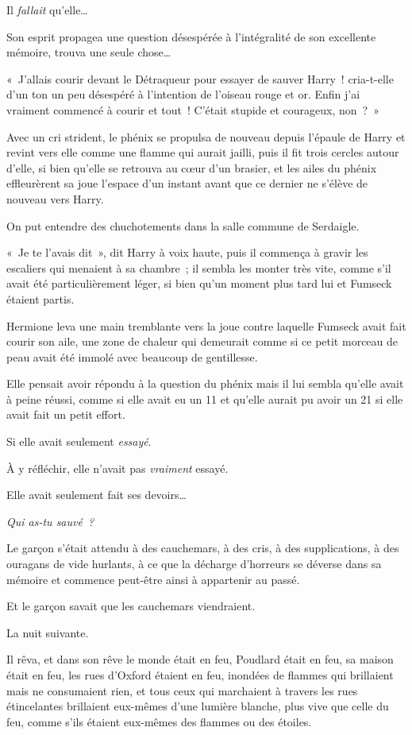 Il \emph{fallait} qu'elle…

Son esprit propagea une question désespérée à l'intégralité de son excellente mémoire, trouva une seule chose…

«~J'allais courir devant le Détraqueur pour essayer de sauver Harry~! cria-t-elle d'un ton un peu désespéré à l'intention de l'oiseau rouge et or. Enfin j'ai vraiment commencé à courir et tout~! C'était stupide et courageux, non~?~»

Avec un cri strident, le phénix se propulsa de nouveau depuis l'épaule de Harry et revint vers elle comme une flamme qui aurait jailli, puis il fit trois cercles autour d'elle, si bien qu'elle se retrouva au cœur d'un brasier, et les ailes du phénix effleurèrent sa joue l'espace d'un instant avant que ce dernier ne s'élève de nouveau vers Harry.

On put entendre des chuchotements dans la salle commune de Serdaigle.

«~Je te l'avais dit~», dit Harry à voix haute, puis il commença à gravir les escaliers qui menaient à sa chambre~; il sembla les monter très vite, comme s'il avait été particulièrement léger, si bien qu'un moment plus tard lui et Fumseck étaient partis.

Hermione leva une main tremblante vers la joue contre laquelle Fumseck avait fait courir son aile, une zone de chaleur qui demeurait comme si ce petit morceau de peau avait été immolé avec beaucoup de gentillesse.

Elle pensait avoir répondu à la question du phénix mais il lui sembla qu'elle avait à peine réussi, comme si elle avait eu un 11 et qu'elle aurait pu avoir un 21 si elle avait fait un petit effort.

Si elle avait seulement \emph{essayé}.

À y réfléchir, elle n'avait pas \emph{vraiment} essayé.

Elle avait seulement fait ses devoirs…

\emph{Qui as-tu sauvé~?}


Le garçon s'était attendu à des cauchemars, à des cris, à des supplications, à des ouragans de vide hurlants, à ce que la décharge d'horreurs se déverse dans sa mémoire et commence peut-être ainsi à appartenir au passé.

Et le garçon savait que les cauchemars viendraient.

La nuit suivante.

Il rêva, et dans son rêve le monde était en feu, Poudlard était en feu, sa maison était en feu, les rues d'Oxford étaient en feu, inondées de flammes qui brillaient mais ne consumaient rien, et tous ceux qui marchaient à travers les rues étincelantes brillaient eux-mêmes d'une lumière blanche, plus vive que celle du feu, comme s'ils étaient eux-mêmes des flammes ou des étoiles.

